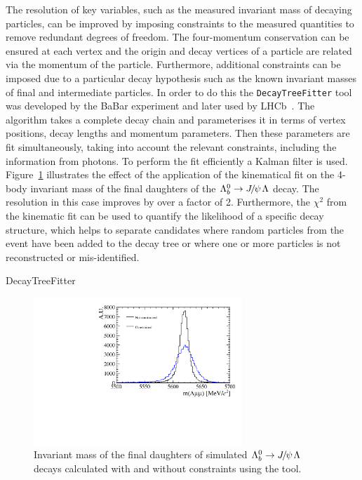 The resolution of key variables, such as the measured invariant mass of decaying particles,
can be improved by imposing constraints to the measured quantities to remove redundant degrees of freedom.
The four-momentum conservation can be ensured at each vertex and the origin and decay vertices of a particle 
are related via the momentum of the particle. Furthermore, additional constraints can be imposed due to a particular
decay hypothesis such as the known invariant masses of final and intermediate particles.
In order to do this the \verb!DecayTreeFitter! tool was developed by the BaBar experiment and later used by LHCb~\cite{Hulsbergen:2005pu}. 
The algorithm takes a complete decay chain and  parameterises it in terms of vertex positions, decay lengths and momentum parameters.
Then these parameters are fit simultaneously, taking into account the relevant constraints, including the information
from photons. To perform the fit efficiently a Kalman filter is used. Figure~\ref{fig:DTFeffect} illustrates the effect of
the application of the kinematical fit on the 4-body invariant mass of the final daughters of the $\Lb\to\jpsi\Lz$ decay.
The resolution in this case improves by over a factor of 2. Furthermore, the $\chi^2$ from the kinematic fit
can be used to quantify the likelihood of a specific decay structure, which helps to separate candidates where random particles
from the event have been added to the decay tree or where one or more particles is not reconstructed or mis-identified.
%
\begin{verbbox}DecayTreeFitter \end{verbbox}
\begin{figure}[h!]
\centering 
\includegraphics[width=0.7\textwidth]{Detector/figs/DTF_performance.pdf}
\caption{Invariant mass of the final daughters of simulated $\Lb\to\jpsi\Lz$ decays calculated
with and without constraints using the \theverbbox  tool. }
\label{fig:DTFeffect}
\end{figure}

